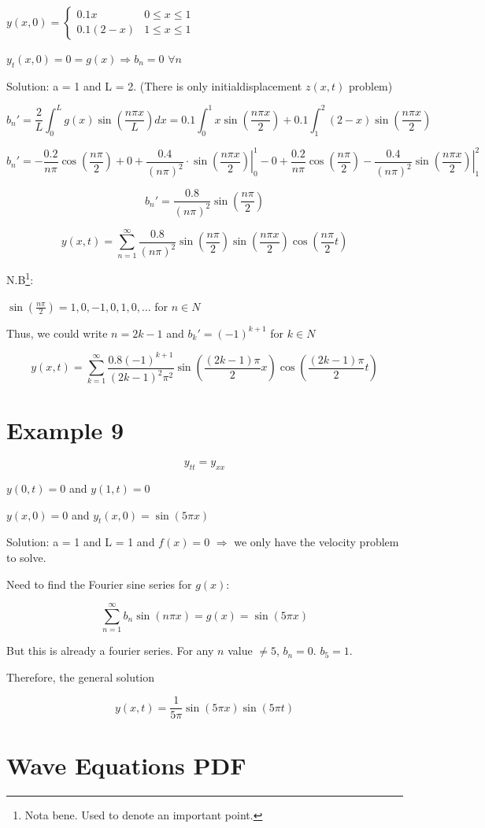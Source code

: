 $y(x,0) = \left\{ \begin{matrix} 0.1 x & 0 \leq x \leq 1 \\ 0.1(2-x) & 1 \leq x \leq 1 \end{matrix} \right.$

$y_t (x,0) = 0 = g(x) \Rightarrow b_n = 0$ $ \forall n$

Solution: a = 1 and L = 2. (There is only initialdisplacement $z(x,t)$ problem)

$$b_n' = \frac{2}{L} \int_0^L g(x) \sin \left( \frac{ n \pi x}{L} \right) dx = 0.1 \int_0^1 x \sin \left( \frac{ n \pi x}{2} \right) + 0.1\int_1^2 (2-x) \sin \left( \frac{ n \pi x}{2} \right) $$

$$b_n' = - \frac{0.2}{n \pi} \cos \left( \frac{n \pi}{2} \right) + 0 + \frac{0.4}{(n \pi)^2 } \cdot \left. \sin \left( \frac{n \pi x}{2} \right) \right|_0^1  - 0 + \frac{0.2}{n \pi} \cos( \frac{n \pi}{2}) - \frac{0.4}{(n \pi)^2} \left. \sin  \left( \frac{n \pi x}{2} \right) \right|_1^2$$

$$b_n' = \frac{0.8}{(n \pi)^2 } \sin \left( \frac{n \pi}{2} \right)$$


$$y(x,t) = \sum_{n = 1}^\infty \frac{0.8}{(n \pi)^2 } \sin \left( \frac{n \pi}{2} \right) \sin \left( \frac{n \pi x}{2} \right) \cos \left( \frac{n \pi}{2} t \right)$$

N.B\footnote{Nota bene. Used to denote an important point. }:

$\sin (\frac{n \pi}{2}) = 1,0,-1,0,1,0,...$ for $n \in N$

Thus, we could write $n = 2k-1$ and $b_k' = (-1)^{k+1}$ for $k \in N$

$$y(x,t) = \sum_{k  =1}^\infty \frac{0.8 (-1)^{k + 1}}{(2k-1)^2 \pi^2} \sin \left( \frac{(2k-1) \pi}{2} x \right) \cos \left( \frac{(2k-1) \pi}{2} t \right)$$

\section{Example 9}

$$y_{tt} = y_{xx}$$

$y(0,t) = 0$ and $y(1,t) = 0$

$y(x,0) = 0$ and $y_t(x,0) = \sin(5 \pi x)$

Solution: a = 1 and L = 1 and $f(x) = 0$ $\Rightarrow$ we only have the velocity problem to solve. 

Need to find the Fourier sine series for $g(x)$:

$$\sum_{n  =1}^\infty b_n \sin(n \pi x) = g(x) = \sin(5 \pi x)$$

But this is already a fourier series. For any $n$ value $\neq 5$, $b_n = 0$. $b_5 = 1$. 

Therefore, the general solution 

$$y(x,t) = \frac{1}{5 \pi} \sin (5 \pi x) \sin(5 \pi t)$$

\section{Wave Equations PDF}


